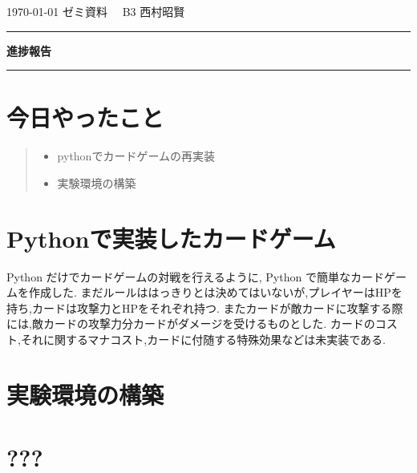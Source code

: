 \documentclass{jarticle}     %
\begin{document}
  \noindent
  \onecolumn
  \hspace{1em}

  \today
  ゼミ資料
  \hfill
  \ \ B3 西村昭賢 

  \vspace{2mm}
  \hrule
  \begin{center}
  {\Large \bf 進捗報告}
  \end{center}
  \hrule
  \vspace{3mm}


\section{今日やったこと}

\begin{quote}
  \begin{itemize}
   \item pythonでカードゲームの再実装
   \item 実験環境の構築
  \end{itemize}
 \end{quote}

\section{Pythonで実装したカードゲーム}
 Python だけでカードゲームの対戦を行えるように, Python で簡単なカードゲームを作成した.
 まだルールははっきりとは決めてはいないが,プレイヤーはHPを持ち,カードは攻撃力とHPをそれぞれ持つ.
 またカードが敵カードに攻撃する際には,敵カードの攻撃力分カードがダメージを受けるものとした.
 カードのコスト,それに関するマナコスト,カードに付随する特殊効果などは未実装である.

\section{実験環境の構築}


\section{???}




\end{document}
